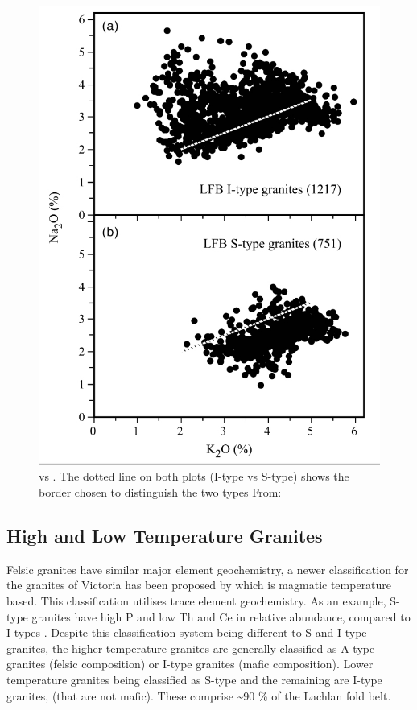 \documentclass[a4paper]{article}
\begin{document}
\begin{figure}[H]
\centering
\includegraphics[width=1\textwidth]{SodiumPotassium.jpg}
\caption{\label{fig:SodiumPotassium}  vs . The dotted line on both plots (I-type vs S-type) shows the border chosen to distinguish the two types  From: \cite{chappell2001two}}
\end{figure}

\subsection{High and Low Temperature Granites}
Felsic granites have similar major element geochemistry, a newer classification for the granites of Victoria has been proposed by \cite{chappell2010high} which is magmatic temperature based. This classification utilises trace element geochemistry. As an example, S-type granites have high P and low Th and Ce in relative abundance, compared to I-types \cite{chappell1998high}. Despite this classification system being different to S and I-type granites, the higher temperature granites are generally classified as A type granites (felsic composition) or I-type granites (mafic composition). Lower temperature granites being classified as S-type and the remaining are I-type granites, (that are not mafic). These comprise \textasciitilde 90 \% of the Lachlan fold belt. \cite{chappell2001two}
\end{document}
